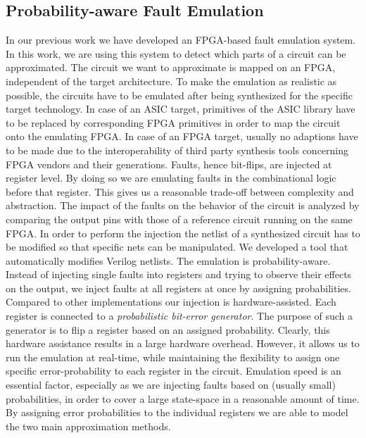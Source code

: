 \documentclass[conference]{IEEEtran}
\begin{document}
\subsection{Probability-aware Fault Emulation}
In our previous work \cite{may2012fpga} we have developed an FPGA-based fault emulation system. In this work, we are using this system to detect which parts of a circuit can be approximated. The circuit we want to approximate is mapped on an FPGA, independent of the target architecture. To make the emulation as realistic as possible, the circuits have to be emulated after being synthesized for the specific target technology. In case of an ASIC target, primitives of the ASIC library have to be replaced by corresponding FPGA primitives in order to map the circuit onto the emulating FPGA. In case of an FPGA target, usually no adaptions have to be made due to the interoperability of third party synthesis tools concerning FPGA vendors and their generations. Faults, hence bit-flips, are injected at register level. By doing so we are emulating faults in the combinational logic before that register. This gives us a reasonable trade-off between complexity and abstraction. The impact of the faults on the behavior of the circuit is analyzed by comparing the output pins with those of a reference circuit running on the same FPGA. In order to perform the injection the netlist of a synthesized circuit has to be modified so that specific nets can be manipulated. We developed a tool that automatically modifies Verilog netlists. The emulation is probability-aware. Instead of injecting single faults into registers and trying to observe their effects on the output, we inject faults at all registers at once by assigning probabilities. Compared to other implementations our injection is hardware-assisted. Each register is connected to a \emph{probabilistic bit-error generator}. The purpose of such a generator is to flip a register based on an assigned probability. Clearly, this hardware assistance results in a large hardware overhead. However, it allows us to run the emulation at real-time, while maintaining the flexibility to assign one specific error-probability to each register in the circuit. Emulation speed is an essential factor, especially as we are injecting faults based on (usually small) probabilities, in order to cover a large state-space in a reasonable amount of time. By assigning error probabilities to the individual registers we are able to model the two main approximation methods.
\end{document}
